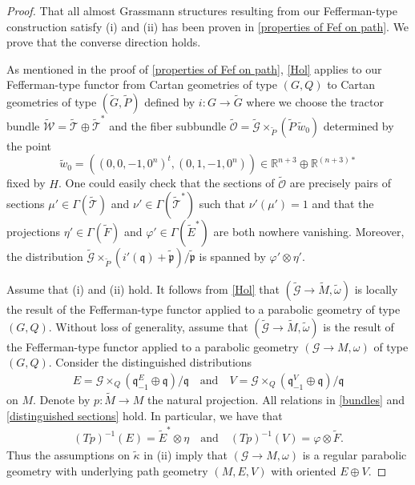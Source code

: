 \documentclass[11pt]{amsart}
\begin{document}
\begin{proof}
That all almost Grassmann structures resulting from our Fefferman-type construction satisfy (i) and (ii) has been proven in \cref{properties of Fef on path}. We prove that the converse direction holds.

As mentioned in the proof of \cref{properties of Fef on path}, \cref{Hol} applies to our Fefferman-type functor from Cartan geometries of type $(G,Q)$ to Cartan geometries of type $(\tilde G,\tilde P)$ defined by $i:G\to\tilde G$ where we choose the tractor bundle $\tilde{\mathcal W}=\tilde{\mathcal T}\oplus\tilde{\mathcal T}^*$ and the fiber subbundle $\tilde{\mathcal O}=\tilde{\mathcal G}\times_{\tilde P}(\tilde P\,\tilde w_0)$ determined by the point
\[\tilde w_0=\left((0,0,-1,0^n)^t,(0,1,-1,0^n)\right)\in\mathbb R^{n+3}\oplus\mathbb R^{(n+3)*}\] fixed by $H$. One could easily check that the sections of $\tilde{\mathcal O}$ are precisely pairs of sections $\mu'\in\Gamma(\tilde{\mathcal T})$ and $\nu'\in\Gamma(\tilde{\mathcal T}^*)$ such that $\nu'(\mu')=1$ and that the projections $\eta'\in\Gamma(\tilde F)$ and $\varphi'\in\Gamma(\tilde E^*)$ are both nowhere vanishing. Moreover, the distribution $\tilde{\mathcal G}\times_{\tilde P}(i'(\mathfrak q)+\tilde{\mathfrak p})/\tilde{\mathfrak p}$ is spanned by $\varphi'\otimes\eta'$.

Assume that (i) and (ii) hold. It follows from \cref{Hol} that $(\tilde{\mathcal G}\to\tilde M,\tilde\omega)$ is locally the result of the Fefferman-type functor applied to a parabolic geometry of type $(G,Q)$. Without loss of generality, assume that $(\tilde{\mathcal G}\to\tilde M,\tilde\omega)$ is the result of the Fefferman-type functor applied to a parabolic geometry $(\mathcal G\to M,\omega)$ of type $(G,Q)$. Consider the distinguished distributions 
\begin{align*}
E=\mathcal G\times_Q(\mathfrak q_{-1}^E\oplus\mathfrak q)/\mathfrak q
\quad\text{and}\quad
V=\mathcal G\times_Q(\mathfrak q_{-1}^V\oplus\mathfrak q)/\mathfrak q
\end{align*}
on $M$. Denote by $p:\tilde M\to M$ the natural projection. All relations in \cref{bundles} and \cref{distinguished sections} hold. In particular, we have that
\begin{align*}
(Tp)^{-1}(E)=\tilde E^*\otimes\eta
\quad\text{and}\quad
(Tp)^{-1}(V)=\varphi\otimes\tilde F.
\end{align*}
Thus the assumptions on $\tilde\kappa$ in (ii) imply that $(\mathcal G\to M,\omega)$ is a regular parabolic geometry with underlying path geometry $(M,E,V)$ with oriented $E\oplus V$.


\end{proof}
\end{document}
